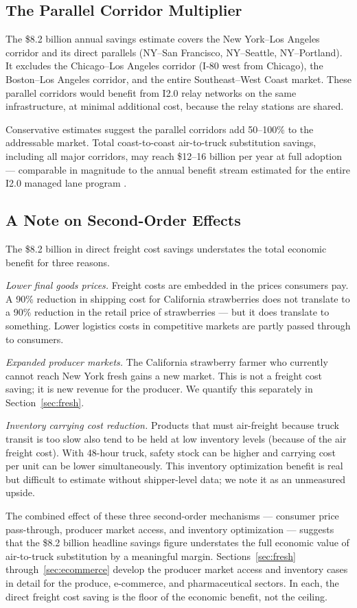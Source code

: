 \subsection{The Parallel Corridor Multiplier}

The \$8.2 billion annual savings estimate covers the New York--Los Angeles corridor and
its direct parallels (NY--San Francisco, NY--Seattle, NY--Portland). It excludes the
Chicago--Los Angeles corridor (I-80 west from Chicago), the Boston--Los Angeles corridor,
and the entire Southeast--West Coast market. These parallel corridors would benefit from
I2.0 relay networks on the same infrastructure, at minimal additional cost, because the
relay stations are shared.

Conservative estimates suggest the parallel corridors add 50--100\% to the addressable
market. Total coast-to-coast air-to-truck substitution savings, including all major
corridors, may reach \$12--16 billion per year at full adoption --- comparable in
magnitude to the annual benefit stream estimated for the entire I2.0 managed lane
program \citep{ROUTE_E1}.

\subsection{A Note on Second-Order Effects}

The \$8.2 billion in direct freight cost savings understates the total economic benefit
for three reasons.

\textit{Lower final goods prices.} Freight costs are embedded in the prices consumers pay.
A 90\% reduction in shipping cost for California strawberries does not translate to a
90\% reduction in the retail price of strawberries --- but it does translate to something.
Lower logistics costs in competitive markets are partly passed through to consumers.

\textit{Expanded producer markets.} The California strawberry farmer who currently cannot
reach New York fresh gains a new market. This is not a freight cost saving; it is new
revenue for the producer. We quantify this separately in Section~\ref{sec:fresh}.

\textit{Inventory carrying cost reduction.} Products that must air-freight because truck
transit is too slow also tend to be held at low inventory levels (because of the air
freight cost). With 48-hour truck, safety stock can be higher and carrying cost per unit
can be lower simultaneously. This inventory optimization benefit is real but difficult to
estimate without shipper-level data; we note it as an unmeasured upside.

The combined effect of these three second-order mechanisms --- consumer price pass-through,
producer market access, and inventory optimization --- suggests that the \$8.2 billion
headline savings figure understates the full economic value of air-to-truck substitution
by a meaningful margin. Sections~\ref{sec:fresh} through~\ref{sec:ecommerce} develop
the producer market access and inventory cases in detail for the produce, e-commerce,
and pharmaceutical sectors. In each, the direct freight cost saving is the floor of the
economic benefit, not the ceiling.
